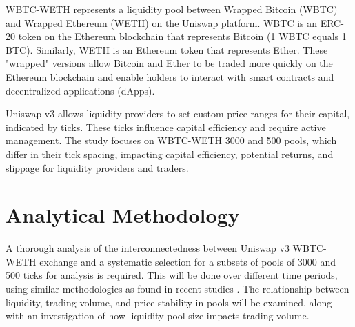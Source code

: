 \documentclass{article}
\begin{document}
WBTC-WETH represents a liquidity pool between Wrapped Bitcoin (WBTC) and Wrapped Ethereum (WETH) on the Uniswap platform. WBTC is an ERC-20 token on the Ethereum blockchain that represents Bitcoin (1 WBTC equals 1 BTC). Similarly, WETH is an Ethereum token that represents Ether. These "wrapped" versions allow Bitcoin and Ether to be traded more quickly on the Ethereum blockchain and enable holders to interact with smart contracts and decentralized applications (dApps).

Uniswap v3 allows liquidity providers to set custom price ranges for their capital, indicated by ticks. These ticks influence capital efficiency and require active management\cite{Elsts2021}. The study focuses on WBTC-WETH 3000 and 500 pools, which differ in their tick spacing, impacting capital efficiency, potential returns, and slippage for liquidity providers and traders.

\section{\textbf{Analytical Methodology}}

A thorough analysis of the interconnectedness between Uniswap v3 WBTC-WETH exchange and a systematic selection for a subsets of pools of 3000 and 500 ticks for analysis is required. This will be done over different time periods, using similar methodologies as found in recent studies \cite{Miori2022}. The relationship between liquidity, trading volume, and price stability in pools will be examined, along with an investigation of how liquidity pool size impacts trading volume.
\end{document}
